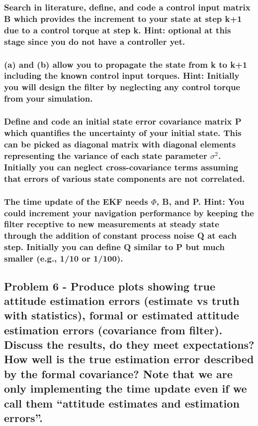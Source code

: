 \subsubsection{Search in literature, define, and code a control input matrix B which provides the increment to your state at step k+1 due to a control torque at step k. Hint: optional at this stage since you do not have a controller yet.}


\subsubsection{(a) and (b) allow you to propagate the state from k to k+1 including the known control input torques. Hint: Initially you will design the filter by neglecting any control torque from your simulation.}

\subsubsection{Define and code an initial state error covariance matrix P which quantifies the uncertainty of your initial state. This can be picked as diagonal matrix with diagonal elements representing the variance of each state parameter $\sigma ^2$. Initially you can neglect cross-covariance terms assuming that errors of various state components are not correlated.}

\subsubsection{The time update of the EKF needs $\Phi$, B, and P. Hint: You could increment your navigation performance by keeping the filter receptive to new measurements at steady state through the addition of constant process noise Q at each step. Initially you can define Q similar to P but much smaller (e.g., 1/10 or 1/100).}

\subsection{Problem 6 - Produce plots showing true attitude estimation errors (estimate vs truth with statistics), formal or estimated attitude estimation errors (covariance from filter). Discuss the results, do they meet expectations? How well is the true estimation error described by the formal covariance? Note that we are only implementing the time update even if we call them “attitude estimates and estimation errors”.}